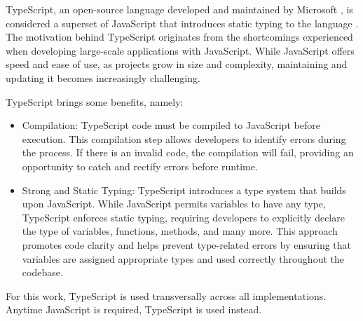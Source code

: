 TypeScript, an open-source language developed and maintained by Microsoft
\cite{typescript-announcement}, is considered a superset of JavaScript that
introduces static typing to the language \cite{typescript-explanation}. The
motivation behind TypeScript originates from the shortcomings experienced when
developing large-scale applications with JavaScript. While JavaScript offers
speed and ease of use, as projects grow in size and complexity, maintaining and
updating it becomes increasingly challenging.

TypeScript brings some benefits, namely:

\begin{itemize}
  \item Compilation: TypeScript code must be compiled to JavaScript before
    execution. This compilation step allows developers to identify errors
    during the process. If there is an invalid code, the compilation will
    fail, providing an opportunity to catch and rectify errors before
    runtime.

  \item Strong and Static Typing: TypeScript introduces a type system that
    builds upon JavaScript. While JavaScript permits variables to have any
    type, TypeScript enforces static typing, requiring developers to
    explicitly declare the type of variables, functions, methods, and many
    more. This approach promotes code clarity and helps prevent type-related
    errors by ensuring that variables are assigned appropriate types and used
    correctly throughout the codebase.

\end{itemize}

For this work, TypeScript is used transversally across all implementations.
Anytime JavaScript is required, TypeScript is used instead.
